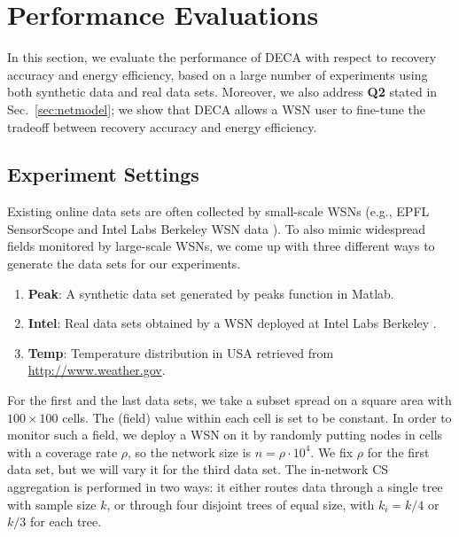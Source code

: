 \documentclass[conference]{IEEEtran}
\begin{document}
\section{Performance Evaluations} \label{sec:perf}
In this section, we evaluate the performance of DECA with respect to recovery accuracy and energy efficiency, based on a large number of experiments using both synthetic data and real data sets. Moreover, we also address \textbf{Q2} stated in Sec.~\ref{sec:netmodel}; we show that DECA allows a WSN user to fine-tune the tradeoff between recovery accuracy and energy efficiency.

  \subsection{Experiment Settings}
Existing online data sets are often collected by small-scale WSNs (e.g., EPFL SensorScope \cite{Sensorscope} and Intel Labs Berkeley WSN data \cite{Intel}). To also mimic widespread fields monitored by large-scale WSNs, we come up with three different ways to generate the data sets for our experiments.
    \begin{enumerate}
\item \textbf{Peak}: A synthetic data set generated by \textsf{peaks} function in Matlab.
\item \textbf{Intel}: Real data sets obtained by a WSN deployed at Intel Labs Berkeley \cite{Intel}.
\item \textbf{Temp}: Temperature distribution in USA retrieved from \url{http://www.weather.gov}.
\end{enumerate}

    For the first and the last data sets, we take a subset spread on a square area with $100\times100$ cells. The (field) value within each cell is set to be constant. In order to monitor such a field, we deploy a WSN on it by randomly putting nodes in cells with a coverage rate $\rho$, so the network size is $n=\rho\cdot10^4$. We fix $\rho$ for the first data set, but we will vary it for the third data set. The in-network CS aggregation is performed in two ways: it either routes data through a single tree with sample size $k$, or through four disjoint trees of equal size, with $k_i = k/4$ or $k/3$ for each tree.
\end{document}
